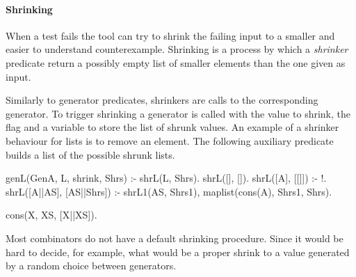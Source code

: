 

\paragraph{\bf Shrinking}

When a test fails the tool can try to shrink the failing input to a
smaller and easier to understand counterexample.
%
Shrinking is a process by which a \emph{shrinker} predicate return a
possibly empty list of smaller elements than the one given as input.


Similarly to generator predicates, shrinkers are calls to the
corresponding generator.
%
To trigger shrinking a generator is called with the value to shrink, the
flag  and a variable to store the list of shrunk values.
%
An example of a shrinker behaviour for lists is to remove an
element.
%
The following auxiliary predicate builds a list of the possible shrunk
lists.
%
\begin{yapcode}
 genL(GenA, L, shrink, Shrs) :-  shrL(L, Shrs).
 shrL([], []).
 shrL([A], [[]]) :- !.
 shrL([A||AS], [AS||Shrs]) :-
   shrL1(AS, Shrs1), maplist(cons(A), Shrs1, Shrs).

 cons(X, XS, [X||XS]).
\end{yapcode}


Most combinators do not have a default shrinking procedure.
%
Since it
would be hard to decide, for example, what would be a proper shrink to a
value generated by a random choice between generators. 
